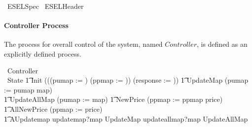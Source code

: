 \begin{zsection}
	\SECTION\ ESELSpec \parents\ ESELHeader
\end{zsection}

\paragraph{Controller Process}
The process for overall control of the system, named $Controller$, is defined as an explicitly defined process.

\begin{circus}
	\circprocess\ Controller \circdef \circbegin \\
%
    	\circstate\ State %
    	\t1	Init \circdef (((pumap := \emptyset) \circseq (ppmap := \emptyset)) \circseq (response := \emptyset))
        \t1 UpdateMap \circdef (pumap := pumap \oplus map)\\
        \t1 UpdateAllMap \circdef (pumap := map)
        \t1 NewPrice \circdef (ppmap := ppmap \oplus price)\\
        \t1 AllNewPrice \circdef (ppmap := price)\\
        \t1 AUpdatemap \circdef updatemap?map \then UpdateMap  \extchoice updateallmap?map \then UpdateAllMap \\

\end{circus}
